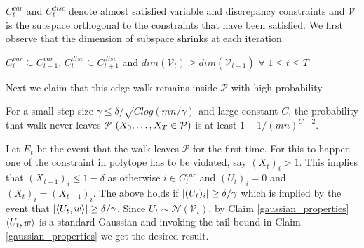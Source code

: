 $C_t^{var}$ and $C_t^{disc}$ denote almost satisfied variable and discrepancy constraints and $\mathcal{V}$ is the subspace orthogonal to the constraints that have been satisfied.
We first observe that the dimension of subspace shrinks at each iteration
\begin{Claim}
$C_t^{var} \subseteq C_{t+1}^{var}$, $C_t^{disc} \subseteq C_{t+1}^{disc}$ and $dim(\mathcal{V}_t) \geq dim(\mathcal{V}_{t+1})$ $\forall$ $1 \leq t \leq T$
\end{Claim}
Next we claim that this edge walk remains inside $\mathcal{P}$ with high probability.
\begin{Claim}
For a small step size $\gamma \leq \delta/\sqrt{Clog(mn/\gamma)}$ and large constant $C$, the probability that walk never leaves $\mathcal{P}$ $\left(X_0,\hdots,X_T \in \mathcal{P} \right )$ is at least $1 - 1/(mn)^{C-2}$.
\end{Claim}
Let $E_t$ be the event that the walk leaves $\mathcal{P}$ for the first time. 
For this to happen one of the constraint in polytope has to be violated, say $(X_t)_i>1$. 
This implies that $(X_{t-1})_i \leq 1 - \delta$ as otherwise $i \in C_t^{var}$ and $(U_t)_i=0$ and $(X_{t})_i=(X_{t-1})_i$. 
The above holds if $\left\lvert (U_t)_i \right\rvert \geq \delta/\gamma$ which is implied by the event that $\left\lvert \left\langle U_t,w\right\rangle \right\rvert \geq \delta/\gamma$.
Since $U_t \sim \mathcal{N}(\mathcal{V}_t)$, by Claim \ref{gaussian_properties} $\left\langle U_t,w\right\rangle$ is a standard Gaussian and invoking the tail bound in Claim \ref{gaussian_properties} we get the desired result.

